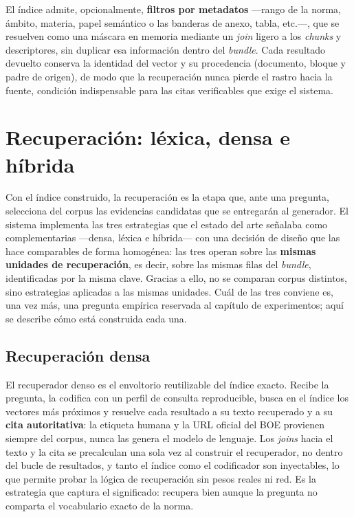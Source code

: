 El índice admite, opcionalmente, \textbf{filtros por metadatos} —rango de la norma, ámbito, materia, papel semántico o las banderas de anexo, tabla, etc.—, que se resuelven como una máscara en memoria mediante un \emph{join} ligero a los \emph{chunks} y descriptores, sin duplicar esa información dentro del \emph{bundle}. Cada resultado devuelto conserva la identidad del vector y su procedencia (documento, bloque y padre de origen), de modo que la recuperación nunca pierde el rastro hacia la fuente, condición indispensable para las citas verificables que exige el sistema.

\section{Recuperación: léxica, densa e híbrida}
\label{sec:recuperacion}

Con el índice construido, la recuperación es la etapa que, ante una pregunta, selecciona del corpus las evidencias candidatas que se entregarán al generador. El sistema implementa las tres estrategias que el estado del arte señalaba como complementarias —densa, léxica e híbrida— con una decisión de diseño que las hace comparables de forma homogénea: las tres operan sobre las \textbf{mismas unidades de recuperación}, es decir, sobre las mismas filas del \emph{bundle}, identificadas por la misma clave. Gracias a ello, no se comparan corpus distintos, sino estrategias aplicadas a las mismas unidades. Cuál de las tres conviene es, una vez más, una pregunta empírica reservada al capítulo de experimentos; aquí se describe cómo está construida cada una.

\subsection{Recuperación densa}
\label{subsec:recuperacion-densa}

El recuperador denso es el envoltorio reutilizable del índice exacto. Recibe la pregunta, la codifica con un perfil de consulta reproducible, busca en el índice los vectores más próximos y resuelve cada resultado a su texto recuperado y a su \textbf{cita autoritativa}: la etiqueta humana y la URL oficial del BOE provienen siempre del corpus, nunca las genera el modelo de lenguaje. Los \emph{joins} hacia el texto y la cita se precalculan una sola vez al construir el recuperador, no dentro del bucle de resultados, y tanto el índice como el codificador son inyectables, lo que permite probar la lógica de recuperación sin pesos reales ni red. Es la estrategia que captura el significado: recupera bien aunque la pregunta no comparta el vocabulario exacto de la norma.

